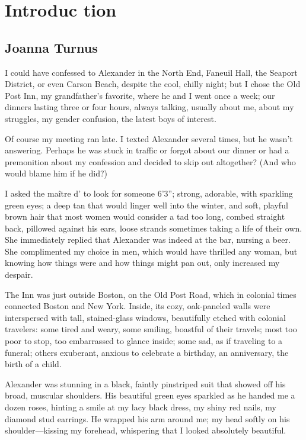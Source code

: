 \part*{Introduc\kern1pt tion}

\chapter*{Joanna Turnus}

\titlemark{}

I could have confessed to Alexander in the North End, Faneuil Hall, the
Seaport District, or even Carson Beach, despite the cool, chilly night;
but I chose the Old Post Inn, my grandfather's favorite, where he and I
went once a week; our dinners lasting three or four hours, always
talking, usually about me, about my struggles, my gender confusion, the
latest boys of interest.

Of course my meeting ran late. I texted Alexander several times, but he
wasn't answering. Perhaps he was stuck in traffic or forgot about our
dinner or had a premonition about my confession and decided to skip out
altogether? (And who would blame him if he did?)

I asked the maître d' to look for someone 6'3''; strong, adorable, with
sparkling green eyes; a deep tan that would linger well into the winter,
and soft, playful brown hair that most women would consider a tad too
long, combed straight back, pillowed against his ears, loose strands
sometimes taking a life of their own. She immediately replied that
Alexander was indeed at the bar, nursing a beer. She complimented my
choice in men, which would have thrilled any woman, but knowing how
things were and how things might pan out, only increased my despair.

The Inn was just outside Boston, on the Old Post Road, which in colonial
times connected Boston and New York. Inside, its cozy, oak-paneled walls
were interspersed with tall, stained-glass windows, beautifully etched
with colonial travelers: some tired and weary, some smiling, boastful of
their travels; most too poor to stop, too embarrassed to glance inside;
some sad, as if traveling to a funeral; others exuberant, anxious to
celebrate a birthday, an anniversary, the birth of a child.

Alexander was stunning in a black, faintly pinstriped suit that showed
off his broad, muscular shoulders. His beautiful green eyes sparkled as
he handed me a dozen roses, hinting a smile at my lacy black dress, my
shiny red nails, my diamond stud earrings. He wrapped his arm around me;
my head softly on his shoulder---kissing my forehead, whispering that I
looked absolutely beautiful.

